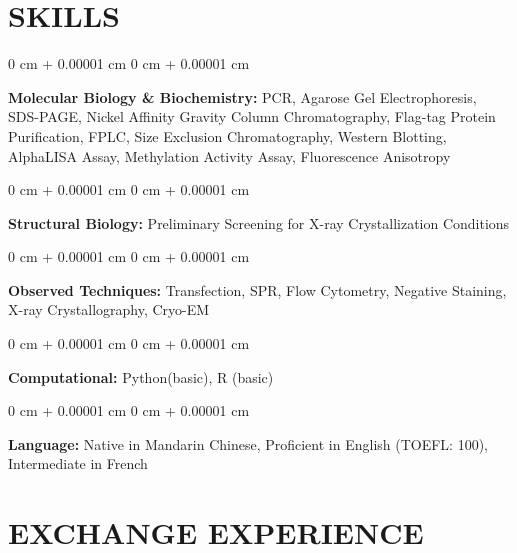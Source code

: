 \documentclass[10pt, letterpaper]{article}
\newenvironment{onecolentry}{
    \begin{adjustwidth}{
        0 cm + 0.00001 cm
    }{
        0 cm + 0.00001 cm
    }
}{
    \end{adjustwidth}
} %
\begin{document}
\section{SKILLS}




       \begin{onecolentry}
            \textbf{Molecular Biology \& Biochemistry:} PCR, Agarose Gel Electrophoresis, SDS-PAGE, Nickel Affinity Gravity Column Chromatography, Flag-tag Protein Purification, FPLC, Size Exclusion Chromatography, Western Blotting, AlphaLISA Assay, Methylation Activity Assay, Fluorescence Anisotropy 
        \end{onecolentry}
        
       \vspace{0.2 cm}

       \begin{onecolentry}
            \textbf{Structural Biology:} Preliminary Screening for X-ray Crystallization Conditions
        \end{onecolentry}
        
       \vspace{0.2 cm}

 \begin{onecolentry}
            \textbf{Observed Techniques:} Transfection, SPR, Flow Cytometry, Negative Staining, X-ray Crystallography, Cryo-EM
        \end{onecolentry}
        
       \vspace{0.2 cm}

        \begin{onecolentry}
            \textbf{Computational:} Python(basic), R (basic)
        \end{onecolentry}

        \vspace{0.2 cm}

        \begin{onecolentry}
            \textbf{Language:} Native in Mandarin Chinese, Proficient in English (TOEFL: 100), Intermediate in French
        \end{onecolentry}

      

    

    \section{EXCHANGE EXPERIENCE}
\end{document}
